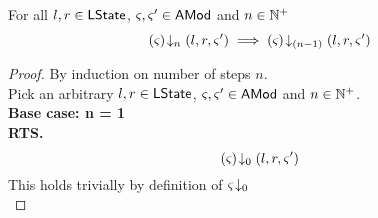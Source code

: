 \begin{lemma}[]\label{lem:amodClosureImplication}
For all $l, r \in \textsf{LState}$, $\varsigma_{}, \varsigma_{}' \in \textsf{AMod}$ and $n \in \mathbb{N}^{+}$
%
\[
	\left(\varsigma_{}\right) \!\downarrow_{n} \left(l, r, \varsigma_{}'\right) \implies \left(\varsigma_{}\right) \!\downarrow_{(n-1)} \left(l, r, \varsigma_{}'\right)
\]
%
\begin{proof} By induction on number of steps $n$.\\
Pick an arbitrary $l, r \in \textsf{LState}$, $\varsigma_{}, \varsigma_{}' \in \textsf{AMod}$ and $n \in \mathbb{N}^{+}$.\\
\textbf{Base case: n = 1}\\
\textbf{RTS.} 
%
\begin{equation}
	\left(\varsigma_{}\right) \!\downarrow_{0} \left(l, r, \varsigma_{}'\right) \nonumber
\end{equation}
%
This holds trivially by definition of $\varsigma_{}\!\downarrow_{0}$\\


\end{proof}
\end{lemma}
